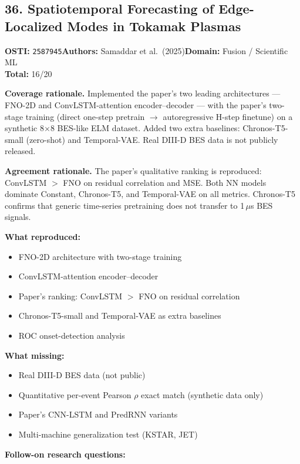 \subsection{36. Spatiotemporal Forecasting of Edge-Localized Modes in Tokamak Plasmas}
\textbf{OSTI:} \texttt{2587945}\quad\textbf{Authors:} Samaddar et al.\ (2025)\quad\textbf{Domain:} Fusion / Scientific ML\\
\quad{}\quad\textbf{Total:} 16/20\par\smallskip
\noindent\textbf{Coverage rationale.} Implemented the paper's two leading architectures --- FNO-2D and ConvLSTM-attention encoder--decoder --- with the paper's two-stage training (direct one-step pretrain $\rightarrow$ autoregressive H-step finetune) on a synthetic 8$\times$8 BES-like ELM dataset. Added two extra baselines: Chronos-T5-small (zero-shot) and Temporal-VAE. Real DIII-D BES data is not publicly released.\par
\noindent\textbf{Agreement rationale.} The paper's qualitative ranking is reproduced: ConvLSTM $>$ FNO on residual correlation and MSE. Both NN models dominate Constant, Chronos-T5, and Temporal-VAE on all metrics. Chronos-T5 confirms that generic time-series pretraining does not transfer to 1\,$\mu$s BES signals.\par\smallskip
\noindent\textbf{What reproduced:}
\begin{itemize}[leftmargin=1.4em,itemsep=0.2em,topsep=0.2em]
\item FNO-2D architecture with two-stage training
\item ConvLSTM-attention encoder--decoder
\item Paper's ranking: ConvLSTM $>$ FNO on residual correlation
\item Chronos-T5-small and Temporal-VAE as extra baselines
\item ROC onset-detection analysis
\end{itemize}
\noindent\textbf{What missing:}
\begin{itemize}[leftmargin=1.4em,itemsep=0.2em,topsep=0.2em]
\item Real DIII-D BES data (not public)
\item Quantitative per-event Pearson $\rho$ exact match (synthetic data only)
\item Paper's CNN-LSTM and PredRNN variants
\item Multi-machine generalization test (KSTAR, JET)
\end{itemize}
\noindent\textbf{Follow-on research questions:}
